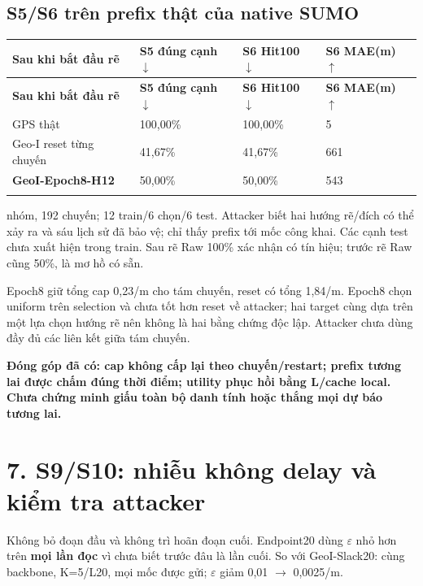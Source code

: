 \documentclass[11pt,a4paper]{article}
\newcommand{\key}[1]{\par\smallskip\noindent\colorbox{pale}{\parbox{\dimexpr\linewidth-2\fboxsep}{\textbf{#1}}}\par\smallskip}
\begin{document}
\subsection*{S5/S6 trên prefix thật của native SUMO}
\begingroup\small
\begin{longtable}{@{}P{6.199cm}P{3.444cm}P{3.444cm}P{3.444cm}@{}}
\toprule
\textbf{Sau khi bắt đầu rẽ} & \textbf{S5 đúng cạnh $\downarrow$} & \textbf{S6 Hit100 $\downarrow$} & \textbf{S6 MAE(m) $\uparrow$}\\\midrule
\endfirsthead
\toprule
\textbf{Sau khi bắt đầu rẽ} & \textbf{S5 đúng cạnh $\downarrow$} & \textbf{S6 Hit100 $\downarrow$} & \textbf{S6 MAE(m) $\uparrow$}\\\midrule
\endhead\bottomrule\endfoot
GPS thật & 100,00\% & 100,00\% & 5\\
\addlinespace[2pt]
Geo-I reset từng chuyến & 41,67\% & 41,67\% & 661\\
\addlinespace[2pt]
\textbf{GeoI-Epoch8-H12} & 50,00\% & 50,00\% & 543\\
\addlinespace[2pt]
\end{longtable}
 nhóm, 192 chuyến; 12 train/6 chọn/6 test. Attacker biết hai hướng rẽ/đích có thể xảy ra và sáu lịch sử đã bảo vệ; chỉ thấy prefix tới mốc công khai. Các cạnh test chưa xuất hiện trong train. Sau rẽ Raw 100\% xác nhận có tín hiệu; trước rẽ Raw cũng 50\%, là mơ hồ có sẵn.

Epoch8 giữ tổng cap 0,23/m cho tám chuyến, reset có tổng 1,84/m. Epoch8 chọn uniform trên selection và chưa tốt hơn reset về attacker; hai target cùng dựa trên một lựa chọn hướng rẽ nên không là hai bằng chứng độc lập. Attacker chưa dùng đầy đủ các liên kết giữa tám chuyến.

\key{Đóng góp đã có: cap không cấp lại theo chuyến/restart; prefix tương lai được chấm đúng thời điểm; utility phục hồi bằng L/cache local. Chưa chứng minh giấu toàn bộ danh tính hoặc thắng mọi dự báo tương lai.}
\clearpage
\section*{7. S9/S10: nhiễu không delay và kiểm tra attacker}
Không bỏ đoạn đầu và không trì hoãn đoạn cuối. Endpoint20 dùng $\varepsilon$ nhỏ hơn trên \textbf{mọi lần đọc} vì chưa biết trước đâu là lần cuối. So với GeoI-Slack20: cùng backbone, K=5/L20, mọi mốc được gửi; $\varepsilon$ giảm 0,01 $\rightarrow$ 0,0025/m.
\end{document}
